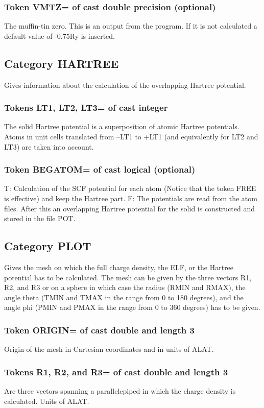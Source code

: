 \documentclass[aps,twocolumn,a4]{revtex4}
\begin{document}
\subsubsection{Token VMTZ= of cast double precision (optional)}
The muffin-tin zero. This is an output from the program. If it is not
calculated a default value of -0.75Ry is inserted.

\subsection{Category HARTREE}
Gives information about the calculation of the overlapping
Hartree potential.

\subsubsection{Tokens LT1, LT2, LT3= of cast integer}
The solid Hartree potential is a superposition of
atomic Hartree potentials.  Atoms in unit cells translated from --LT1
to +LT1 (and equivalently for LT2 and LT3) are taken into account.

\subsubsection{Token BEGATOM= of cast logical (optional)}
T: Calculation of the SCF potential for each atom (Notice that the
token FREE is effective) and keep the Hartree part.
F: The potentials are read from the atom files.  After this an
overlapping Hartree potential for the solid is constructed and stored
in the file POT.

\subsection{Category PLOT}
Gives the mesh on which the full charge density, the ELF,
or the Hartree potential has to be calculated. The mesh can be given
by the three vectors R1, R2, and R3 or on a sphere in which case the
radius (RMIN and RMAX), the angle theta (TMIN and TMAX in the range
from 0 to 180 degrees), and the angle phi
(PMIN and PMAX in the range from 0 to 360 degrees) has to be given.

\subsubsection{Token ORIGIN= of cast double and length 3}
Origin of the mesh in Cartesian coordinates and in units of ALAT.

\subsubsection{Tokens R1, R2, and R3= of cast double and length 3}
Are three vectors spanning a parallelepiped in
which the charge density is calculated.  Units of ALAT.
\end{document}
